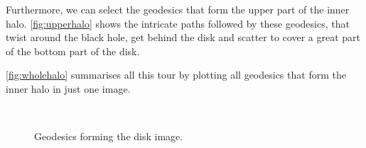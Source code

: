Furthermore, we can select the geodesics that form the upper part of the inner halo. \autoref{fig:upperhalo} shows the intricate paths followed by these geodesics, that twist around the black hole, get behind the disk and scatter to cover a great part of the bottom part of the disk.

\autoref{fig:wholehalo} summarises all this tour by plotting all geodesics that form the inner halo in just one image.

\begin{figure}[bth]
	\myfloatalign
	 \quad
	 \\
	 \quad
	\caption[Geodesics forming the disk image.]{Geodesics forming the disk image.}\label{fig:geodesicsdisk}
\end{figure}

